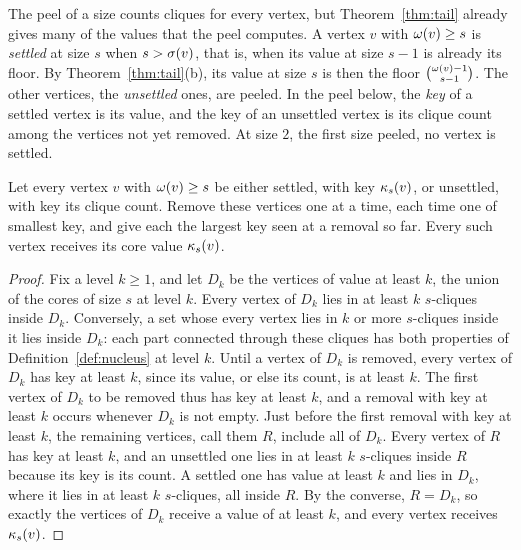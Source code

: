 The peel of a size counts cliques for every vertex, but Theorem~\ref{thm:tail} already gives many of the values that the peel computes.
%
A vertex $v$ with $\omega(v)\ge s$ is \textit{settled} at size $s$ when $s>\sigma(v)$, that is, when its value at size $s-1$ is already its floor.
%
By Theorem~\ref{thm:tail}(b), its value at size $s$ is then the floor $\binom{\omega(v)-1}{s-1}$.
%
The other vertices, the \textit{unsettled} ones, are peeled.
%
In the peel below, the \textit{key} of a settled vertex is its value, and the key of an unsettled vertex is its clique count among the vertices not yet removed.
%
At size $2$, the first size peeled, no vertex is settled.
\begin{theorem}\label{thm:settled}
Let every vertex $v$ with $\omega(v)\ge s$ be either settled, with key $\kappa_{s}(v)$, or unsettled, with key its clique count.
%
Remove these vertices one at a time, each time one of smallest key, and give each the largest key seen at a removal so far.
%
Every such vertex receives its core value $\kappa_{s}(v)$.
\end{theorem}
\begin{proof}
Fix a level $k\ge1$, and let $D_k$ be the vertices of value at least $k$, the union of the cores of size $s$ at level $k$.
%
Every vertex of $D_k$ lies in at least $k$ $s$-cliques inside $D_k$.
%
Conversely, a set whose every vertex lies in $k$ or more $s$-cliques inside it lies inside $D_k$: each part connected through these cliques has both properties of Definition~\ref{def:nucleus} at level $k$.
%
Until a vertex of $D_k$ is removed, every vertex of $D_k$ has key at least $k$, since its value, or else its count, is at least $k$.
%
The first vertex of $D_k$ to be removed thus has key at least $k$, and a removal with key at least $k$ occurs whenever $D_k$ is not empty.
%
Just before the first removal with key at least $k$, the remaining vertices, call them $R$, include all of $D_k$.
%
Every vertex of $R$ has key at least $k$, and an unsettled one lies in at least $k$ $s$-cliques inside $R$ because its key is its count.
%
A settled one has value at least $k$ and lies in $D_k$, where it lies in at least $k$ $s$-cliques, all inside $R$.
%
By the converse, $R=D_k$, so exactly the vertices of $D_k$ receive a value of at least $k$, and every vertex receives $\kappa_{s}(v)$.
\end{proof}
